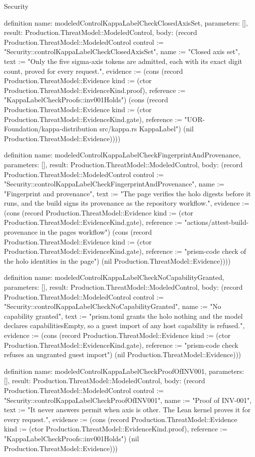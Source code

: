 \begin{lexlean}{Security}
\begin{semanticmodule}
definition{
  name: modeledControlKappaLabelCheckClosedAxisSet,
  parameters: [],
  result: Production.ThreatModel::ModeledControl,
  body: (record Production.ThreatModel::ModeledControl {control := "Security::controlKappaLabelCheckClosedAxisSet", name := "Closed axis set", text := "Only the five sigma-axis tokens are admitted, each with its exact digit count, proved for every request.", evidence := (cons (record Production.ThreatModel::Evidence {kind := (ctor Production.ThreatModel::EvidenceKind.proof), reference := "KappaLabelCheckProofs::inv001Holds"}) (cons (record Production.ThreatModel::Evidence {kind := (ctor Production.ThreatModel::EvidenceKind.gate), reference := "UOR-Foundation/kappa-distribution src/kappa.rs KappaLabel"}) (nil Production.ThreatModel::Evidence)))})
}

definition{
  name: modeledControlKappaLabelCheckFingerprintAndProvenance,
  parameters: [],
  result: Production.ThreatModel::ModeledControl,
  body: (record Production.ThreatModel::ModeledControl {control := "Security::controlKappaLabelCheckFingerprintAndProvenance", name := "Fingerprint and provenance", text := "The page verifies the holo digests before it runs, and the build signs its provenance as the repository workflow.", evidence := (cons (record Production.ThreatModel::Evidence {kind := (ctor Production.ThreatModel::EvidenceKind.gate), reference := "actions/attest-build-provenance in the pages workflow"}) (cons (record Production.ThreatModel::Evidence {kind := (ctor Production.ThreatModel::EvidenceKind.gate), reference := "prism-code check of the holo identities in the page"}) (nil Production.ThreatModel::Evidence)))})
}

definition{
  name: modeledControlKappaLabelCheckNoCapabilityGranted,
  parameters: [],
  result: Production.ThreatModel::ModeledControl,
  body: (record Production.ThreatModel::ModeledControl {control := "Security::controlKappaLabelCheckNoCapabilityGranted", name := "No capability granted", text := "prism.toml grants the holo nothing and the model declares capabilitiesEmpty, so a guest import of any host capability is refused.", evidence := (cons (record Production.ThreatModel::Evidence {kind := (ctor Production.ThreatModel::EvidenceKind.gate), reference := "prism-code check refuses an ungranted guest import"}) (nil Production.ThreatModel::Evidence))})
}

definition{
  name: modeledControlKappaLabelCheckProofOfINV001,
  parameters: [],
  result: Production.ThreatModel::ModeledControl,
  body: (record Production.ThreatModel::ModeledControl {control := "Security::controlKappaLabelCheckProofOfINV001", name := "Proof of INV-001", text := "It never answers permit when axis is other. The Lean kernel proves it for every request.", evidence := (cons (record Production.ThreatModel::Evidence {kind := (ctor Production.ThreatModel::EvidenceKind.proof), reference := "KappaLabelCheckProofs::inv001Holds"}) (nil Production.ThreatModel::Evidence))})
}


\end{semanticmodule}
\end{lexlean}
